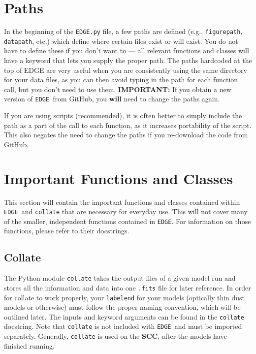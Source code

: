 \documentclass{emulateapj}
\newcommand{\edge}{\texttt{EDGE }}
\begin{document}
\section{Paths}
In the beginning of the \texttt{EDGE.py} file, a few paths are defined (e.g., \texttt{figurepath}, \texttt{datapath}, etc.) which define where certain files exist or will exist. You do not have to define these if you don’t want to — all relevant functions and classes will have a keyword that lets you supply the proper path. The paths hardcoded at the top of EDGE are very useful when you are consistently using the same directory for your data files, as you can then avoid typing in the path for each function call, but you don’t need to use them. \textbf{IMPORTANT:} If you obtain a new version of \edge from GitHub, you \textbf{will} need to change the paths again. 

If you are using scripts (recommended), it is often better to simply include the path as a part of the call to each function, as it increases portability of the script. This also negates the need to change the paths if you re-download the code from GitHub.
 
\section{Important Functions and Classes}

This section will contain the important functions and classes contained within \edge and \texttt{collate} that are necessary for everyday use. This will not cover many of the smaller, independent functions contained in \texttt{EDGE}. For information on those functions, please refer to their docstrings. 
 
\subsection{Collate}
 
The Python module \texttt{collate} takes the output files of a given model run and stores all the information and data into one \texttt{.fits} file for later reference. In order for collate to work properly, your \texttt{labelend} for your models (optically thin dust models or otherwise) must follow the proper naming convention, which will be outlined later. The inputs and keyword arguments can be found in the \texttt{collate} docstring. Note that \texttt{collate} is not included with \edge and must be imported separately. 
Generally, \texttt{collate} is used on the \textbf{SCC}, after the models have finished running. 
\end{document}
